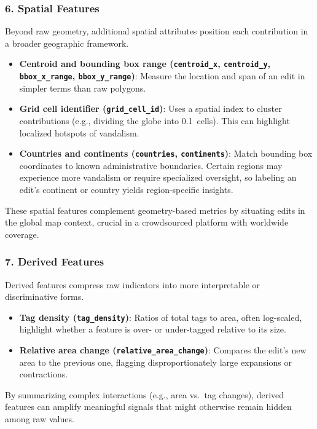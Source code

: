 \documentclass[
    13pt, %
    a4paper, %
    twoside, 
    DIV14, %
    listof=totoc, %
    bibliography=totoc, %
    index=totoc, %
    headsepline
]{scrreprt}
\begin{document}
\subsubsection*{6. Spatial Features}
Beyond raw geometry, additional spatial attributes position each contribution in a broader geographic framework.

\begin{itemize}
  \item \textbf{Centroid and bounding box range (\texttt{centroid\_x}, \texttt{centroid\_y}, \texttt{bbox\_x\_range}, \texttt{bbox\_y\_range})}: Measure the location and span of an edit in simpler terms than raw polygons.
  \item \textbf{Grid cell identifier (\texttt{grid\_cell\_id})}: Uses a spatial index to cluster contributions (e.g., dividing the globe into 0.1\degree\ cells). This can highlight localized hotspots of vandalism.
  \item \textbf{Countries and continents (\texttt{countries}, \texttt{continents})}: Match bounding box coordinates to known administrative boundaries. Certain regions may experience more vandalism or require specialized oversight, so labeling an edit’s continent or country yields region-specific insights.
\end{itemize}

These spatial features complement geometry-based metrics by situating edits in the global map context, crucial in a crowdsourced platform with worldwide coverage.

\subsubsection*{7. Derived Features}
Derived features compress raw indicators into more interpretable or discriminative forms.

\begin{itemize}
  \item \textbf{Tag density (\texttt{tag\_density})}: Ratios of total tags to area, often log-scaled, highlight whether a feature is over- or under-tagged relative to its size.
  \item \textbf{Relative area change (\texttt{relative\_area\_change})}: Compares the edit’s new area to the previous one, flagging disproportionately large expansions or contractions.
\end{itemize}

By summarizing complex interactions (e.g., area vs.\ tag changes), derived features can amplify meaningful signals that might otherwise remain hidden among raw values.
\end{document}
